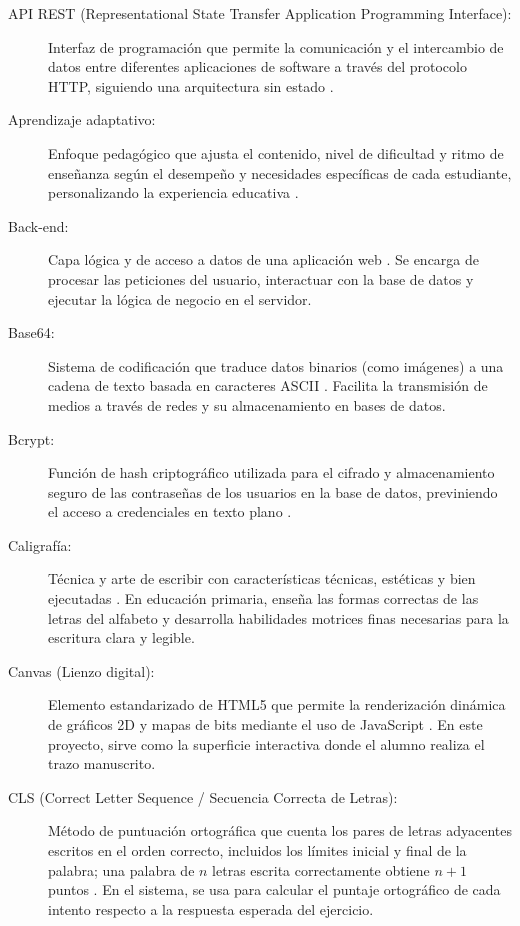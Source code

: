\documentclass[12pt]{article}
\begin{document}
\begin{description}
    \item[API REST (Representational State Transfer Application Programming Interface):] Interfaz de programación que permite la comunicación y el intercambio de datos entre diferentes aplicaciones de software a través del protocolo HTTP, siguiendo una arquitectura sin estado \cite{fielding2000rest}.
    \item[Aprendizaje adaptativo:] Enfoque pedagógico que ajusta el contenido, nivel de dificultad y ritmo de enseñanza según el desempeño y necesidades específicas de cada estudiante, personalizando la experiencia educativa \cite{shute2012adaptive}.
    \item[Back-end:] Capa lógica y de acceso a datos de una aplicación web \cite{fielding2000rest}. Se encarga de procesar las peticiones del usuario, interactuar con la base de datos y ejecutar la lógica de negocio en el servidor.
    \item[Base64:] Sistema de codificación que traduce datos binarios (como imágenes) a una cadena de texto basada en caracteres ASCII \cite{rfc4648}. Facilita la transmisión de medios a través de redes y su almacenamiento en bases de datos.
    \item[Bcrypt:] Función de hash criptográfico utilizada para el cifrado y almacenamiento seguro de las contraseñas de los usuarios en la base de datos, previniendo el acceso a credenciales en texto plano \cite{provos1999bcrypt}.
    \item[Caligrafía:] Técnica y arte de escribir con características técnicas, estéticas y bien ejecutadas \cite{raeDLE}. En educación primaria, enseña las formas correctas de las letras del alfabeto y desarrolla habilidades motrices finas necesarias para la escritura clara y legible.
    \item[Canvas (Lienzo digital):] Elemento estandarizado de HTML5 que permite la renderización dinámica de gráficos 2D y mapas de bits mediante el uso de JavaScript \cite{whatwgCanvas}. En este proyecto, sirve como la superficie interactiva donde el alumno realiza el trazo manuscrito.
    \item[CLS (Correct Letter Sequence / Secuencia Correcta de Letras):] Método de puntuación ortográfica que cuenta los pares de letras adyacentes escritos en el orden correcto, incluidos los límites inicial y final de la palabra; una palabra de $n$ letras escrita correctamente obtiene $n+1$ puntos \cite{treiman2016measures, aimswebplus2025manual}. En el sistema, se usa para calcular el puntaje ortográfico de cada intento respecto a la respuesta esperada del ejercicio.

\end{description}
\end{document}

